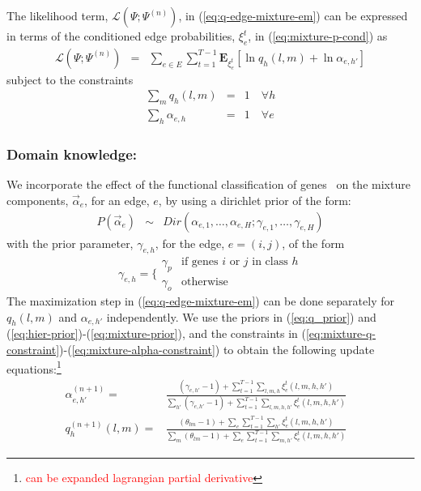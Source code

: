 \documentclass{bioinfo}
\begin{document}
\begin{methods}
\begin{equation}
\end{equation}
The likelihood term, $ {\mathcal L}(\Psi; \Psi^{(n)})$, in (\ref{eq:q-edge-mixture-em}) can be expressed
in terms of the conditioned edge probabilities, $\xi^t_e$, in
(\ref{eq:mixture-p-cond}) as 
\begin{eqnarray}
  \label{eq:mixture-L-edge}
  {\mathcal L}(\Psi; \Psi^{(n)}) &=& \sum_{e\in E}\sum_{t=1}^{T-1}
  \mathbf{E}_{\xi^t_e}[\ln q_h(l, m) + \ln \alpha_{e,h'}]
\end{eqnarray}
subject to the constraints
\begin{eqnarray}
  \label{eq:mixture-q-constraint} \sum_{m} q_h(l,m) &=& 1 \quad\forall h \\
   \label{eq:mixture-alpha-constraint} \sum_{h} \alpha_{e,h} &=& 1 \quad\forall e
\end{eqnarray}
\subsubsection{Domain knowledge:}
We incorporate the effect of the functional classification of
genes~\cite{DBLP:journals/nar/MewesAHLP97} on the mixture components,
$\vec{\alpha}_e$, for an edge, $e$, by using a dirichlet prior of the form:
\begin{eqnarray}
  \label{eq:hier-prior}
  P(\vec{\alpha}_e) &\sim& Dir(\alpha_{e,1},\ldots, \alpha_{e,H};
  \gamma_{e,1},\ldots, \gamma_{e,H}) 
\end{eqnarray}
with the prior parameter, $\gamma_{e,h}$, for the edge, $e=(i,j)$, of the
form 
\begin{equation}
  \label{eq:mixture-prior}
  \gamma_{e,h} = \Big\{ \begin{array}{ll}
                       \gamma_p & \textrm{if genes }  i \textrm{ or } j
                       \textrm{ in class } h \\
                       \gamma_o & \textrm{otherwise}
                       \end{array}
\end{equation}
The maximization step in (\ref{eq:q-edge-mixture-em}) can  be done
separately for $q_h(l,m)$ and $\alpha_{e,h'}$ independently. We use
the priors in (\ref{eq:q_prior}) and
(\ref{eq:hier-prior})-(\ref{eq:mixture-prior}), and the constraints in
(\ref{eq:mixture-q-constraint})-(\ref{eq:mixture-alpha-constraint}) to
obtain the following update equations:\footnote{\textcolor{red}{can be expanded lagrangian partial derivative}}
\begin{eqnarray}
  \label{eq:mixture-alpha-update}
  \alpha_{e,h'}^{(n+1)} =&  \frac{(\gamma_{e,h'}-1) + \sum_{t=1}^{T-1} \sum_{l,m,h}\xi^{t}_{e}(l,
    m,h,h') }{\sum_{h'} (\gamma_{e,h'} -1) + \sum^{T-1}_{t=1}
    \sum_{l,m,h,h'} \xi^{t}_{e}(l,m,h,h')} & \\
\label{eq:mixture-q-update} 
q^{(n+1)}_h(l,m) =&  \frac{(\theta_{lm}-1) + \sum_e \sum_{t=1}^{T-1}\sum_{h'}\xi^{t}_{e}(l,
    m,h,h') }{\sum_{m} (\theta_{lm} -1) + \sum_e \sum^{T-1}_{t=1}
    \sum_{m,h'} \xi^{t}_{e}(l,m,h,h')} &
\end{eqnarray}


\end{methods}
\end{document}
